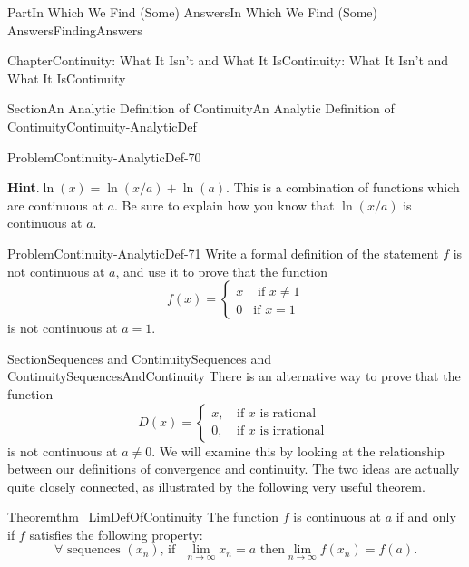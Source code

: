 \documentclass[oneside,10pt,]{book}
\newcommand{\blocktitlefont}{\relax}
\numberwithin{equation}{part}
\newcommand{\amp}{&}
\begin{document}
\begin{partptx}{Part}{In Which We Find (Some) Answers}{}{In Which We Find (Some) Answers}{}{}{FindingAnswers}
\begin{chapterptx}{Chapter}{Continuity: What It Isn't and What It Is}{}{Continuity: What It Isn't and What It Is}{}{}{Continuity}
\begin{sectionptx}{Section}{An Analytic Definition of Continuity}{}{An Analytic Definition of Continuity}{}{}{Continuity-AnalyticDef}
\begin{problem}{Problem}{}{Continuity-AnalyticDef-70}
\begin{enumerate}[font=\bfseries,label=(\alph*),ref=\alph*]
\par\smallskip%
\noindent\textbf{\blocktitlefont Hint}.\hypertarget{Continuity-AnalyticDef-70-3-2}{}\quad{}\(\ln(x)=\ln(x/a)+\ln(a)\).  This is a combination of functions which are continuous at \(a\).  Be sure to explain how you know that \(\ln(x/a)\) is continuous at \(a\).%
\end{enumerate}%
\end{problem}
\begin{problem}{Problem}{}{Continuity-AnalyticDef-71}%
 Write a formal definition of the statement \(f\) is not continuous at \(a\), and use it to prove that the function%
\begin{equation*}
f(x)= 
\begin{cases}
x\amp \text{ if } x\neq 1\\
0\amp \text{if } x=1 
\end{cases}
\end{equation*}
is not continuous at \(a=1\).%
\end{problem}
\end{sectionptx}
%
%
\typeout{************************************************}
\typeout{************************************************}
%
\begin{sectionptx}{Section}{Sequences and Continuity}{}{Sequences and Continuity}{}{}{SequencesAndContinuity}
There is an alternative way to prove that the function%
\begin{equation*}
D(x)=\left\{ \begin{matrix}x\text{,} \amp \text{ if } x\text{ is rational } \\ 0\text{,} \amp \text{ if } x\text{ is irrational } \end{matrix} \right.
\end{equation*}
is not continuous at \(a\neq 0\).  We will examine this by looking at the relationship between our definitions of convergence and continuity.  The two ideas are actually quite closely connected, as illustrated by the following very useful theorem.%
\begin{theorem}{Theorem}{}{}{thm_LimDefOfContinuity}%
 The function \(f\) is continuous at \(a\) if and only if \(f\) satisfies the following property:%
\begin{equation*}
\forall\text{ sequences } \left(x_n\right)\text{, if } \,\,\lim_{n\rightarrow\infty}x_n=a \text{ then} \lim_{n\rightarrow\infty}f(x_n)=f(a).{}
\end{equation*}

\end{theorem}
\end{sectionptx}
\end{chapterptx}
\end{partptx}
\end{document}
